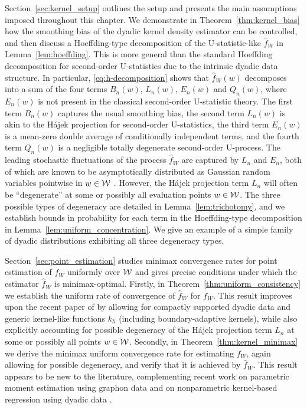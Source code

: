 Section~\ref{sec:kernel_setup} outlines the setup and presents the main
assumptions imposed throughout this chapter. We demonstrate in
Theorem~\ref{thm:kernel_bias} how the smoothing bias of the dyadic kernel
density estimator can be controlled, and then discuss a Hoeffding-type
decomposition of the U-statistic-like $\hat{f}_W$
in Lemma~\ref{lem:hoeffding}. This is more general than
the standard Hoeffding decomposition for second-order U-statistics due to the
intrinsic dyadic data structure. In particular, \eqref{eq:h-decomposition}
shows that $\hat{f}_W(w)$ decomposes into a sum of the four terms $B_n(w)$,
$L_n(w)$, $E_n(w)$ and $Q_n(w)$, where $E_n(w)$ is not present in the classical
second-order U-statistic theory. The first term $B_n(w)$ captures the usual
smoothing bias, the second term $L_n(w)$ is akin to the H{\'a}jek projection
for second-order U-statistics, the third term $E_n(w)$ is a mean-zero double
average of conditionally independent terms, and the fourth term $Q_n(w)$ is a
negligible totally degenerate second-order U-process. The leading stochastic
fluctuations of the process $\hat{f}_W$ are captured by $L_n$ and $E_n$, both
of which are known to be asymptotically distributed as Gaussian random
variables pointwise in $w\in\mathcal{W}$ \citep{graham2024kernel}. However, the
H{\'a}jek projection term $L_n$ will often be ``degenerate'' at some or
possibly all evaluation points $w\in\mathcal{W}$.
The three possible types of degeneracy are detailed in
Lemma~\ref{lem:trichotomy},
and we establish bounds in probability for each term in the Hoeffding-type
decomposition in Lemma~\ref{lem:uniform_concentration}.
We give an example of a simple family of dyadic distributions
exhibiting all three degeneracy types.

Section~\ref{sec:point_estimation} studies minimax convergence rates for point
estimation of $f_W$ uniformly over $\mathcal{W}$ and gives precise conditions under
which the estimator $\hat{f}_W$ is minimax-optimal. Firstly, in
Theorem~\ref{thm:uniform_consistency} we establish the uniform rate of
convergence of $\hat{f}_W$ for $f_W$. This result improves upon the recent
paper of \citet{chiang2020empirical} by allowing for compactly supported dyadic
data and generic kernel-like functions $k_h$ (including boundary-adaptive
kernels), while also explicitly accounting for possible degeneracy of the
H\'{a}jek projection term $L_n$ at some or possibly all points $w\in\mathcal{W}$.
Secondly, in Theorem~\ref{thm:kernel_minimax} we derive the minimax uniform
convergence rate for estimating $f_W$, again allowing for possible degeneracy,
and verify that it is achieved by $\hat f_W$. This result appears to be new to
the literature, complementing recent work on parametric moment estimation using
graphon data \citep{gao2021minimax} and on nonparametric kernel-based
regression using dyadic data \citep{graham2021minimax}.

